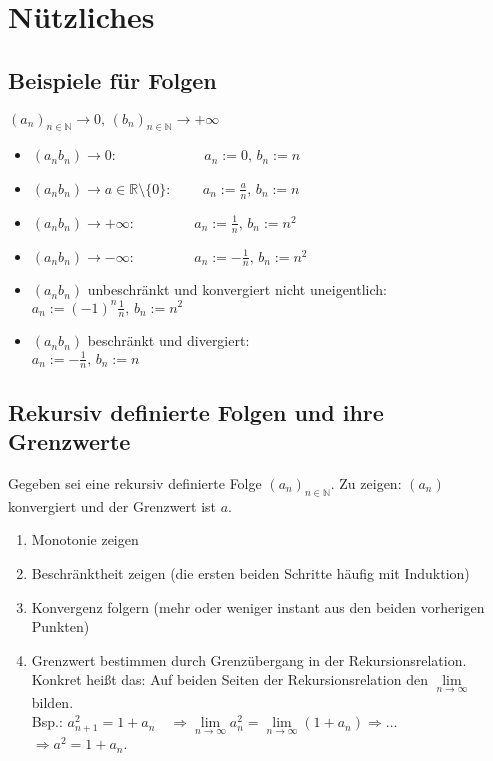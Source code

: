 \documentclass[10pt,a4paper^, twocolumn]{article}
\newcommand{\R}{\mathbb{R}}
\newcommand{\N}{\mathbb{N}}
\begin{document}
\section{Nützliches}
	\subsection{Beispiele für Folgen}
		$(a_n)_{n \in \N} \to 0, \, (b_n)_{n \in \N} \to +\infty$\\
		\begin{itemize}
			\item $(a_n b_n) \to 0$: 
				$ \qquad \qquad \qquad a_n := 0, \, b_n := n$
			\item $(a_n b_n) \to a \in \R \setminus \{0\}$: 
				$ \qquad a_n := \frac{a}{n}, \, b_n := n$
			\item $(a_n b_n) \to + \infty$: 
				$ \qquad \qquad a_n := \frac{1}{n}, \, b_n := n^2$
			\item $(a_n b_n) \to - \infty$: 
				$ \qquad  \qquad a_n := -\frac{1}{n}, \, b_n := n^2$
			\item $(a_n b_n)$ unbeschränkt und konvergiert nicht uneigentlich:\\
				$a_n := (-1)^n\frac{1}{n}, \, b_n := n^2$
			\item $(a_n b_n)$ beschränkt und divergiert:\\ 
				$a_n := -\frac{1}{n}, \, b_n := n$
		\end{itemize}
	\subsection{Rekursiv definierte Folgen und ihre Grenzwerte}
	Gegeben sei eine rekursiv definierte Folge $(a_n)_{n \in \N}$. 
	Zu zeigen: $(a_n)$ konvergiert und der Grenzwert ist $a$.
	\begin{enumerate}
		\item Monotonie zeigen 
		\item Beschränktheit zeigen (die ersten beiden Schritte häufig mit Induktion)
		\item Konvergenz folgern (mehr oder weniger instant aus den beiden vorherigen Punkten)
		\item Grenzwert bestimmen durch Grenzübergang in der Rekursionsrelation. Konkret heißt
		das: Auf beiden Seiten der Rekursionsrelation den $\lim\limits_{n \to \infty}$ bilden.\\
		Bsp.: $a_{n+1}^2 = 1 + a_n \quad \Rightarrow \lim\limits_{n \to \infty} a_n^2 =
		\lim\limits_{n \to \infty} (1 + a_n)
		\Rightarrow \dots $\\
		$\Rightarrow a^2 = 1 + a_n$.
	\end{enumerate}
\end{document}
